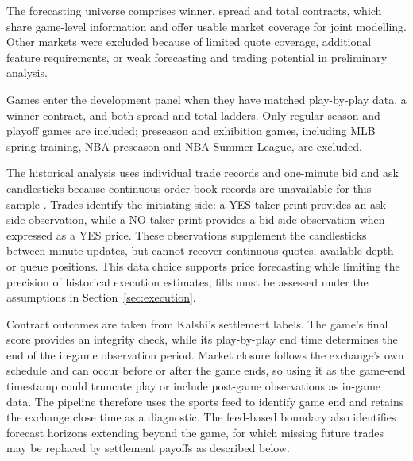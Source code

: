\documentclass[12pt,a4paper,oneside]{report}
\begin{document}
The forecasting universe comprises winner, spread and total contracts, which
share game-level information and offer usable market coverage for joint
modelling. Other markets were excluded because of limited quote coverage,
additional feature requirements, or weak forecasting and trading potential in
preliminary analysis. 

Games enter the development panel when they have matched play-by-play data,
a winner contract, and both spread and total ladders. Only regular-season and
playoff games are included; preseason and exhibition games, including MLB spring
training, NBA preseason and NBA Summer League, are excluded.

The historical analysis uses individual trade records and one-minute bid and ask
candlesticks because continuous order-book records are unavailable for this sample
\citep{kalshi2026trades,kalshi2026candles}. Trades identify the initiating side:
a YES-taker print provides an ask-side observation, while a NO-taker print
provides a bid-side observation when expressed as a YES price. These observations
supplement the candlesticks between minute updates, but cannot recover continuous
quotes, available depth or queue positions. This data choice supports price
forecasting while limiting the precision of historical execution estimates;
fills must be assessed under the assumptions in Section~\ref{sec:execution}.

Contract outcomes are taken from Kalshi's settlement labels. The game's final
score provides an integrity check, while its play-by-play end time determines
the end of the in-game observation period. Market closure follows the exchange's
own schedule and can occur before or after the game ends, so using it as the
game-end timestamp could truncate play or include post-game observations as
in-game data. The pipeline therefore uses the sports feed to identify game end
and retains the exchange close time as a diagnostic. The feed-based boundary
also identifies forecast horizons extending beyond the game, for which missing
future trades may be replaced by settlement payoffs as described below.
\end{document}
